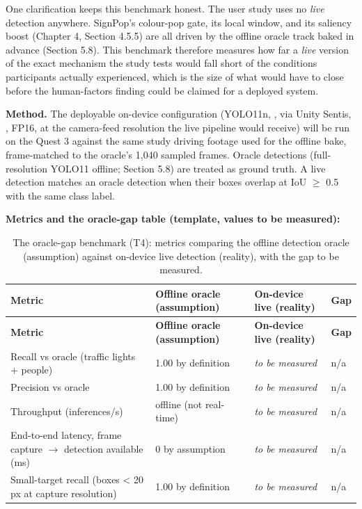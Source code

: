 One clarification keeps this benchmark honest. The user study uses no \textit{live} detection anywhere.
SignPop's colour-pop gate, its local window, and its saliency boost (Chapter 4, Section 4.5.5) are
all driven by the offline oracle track baked in advance (Section 5.8). This benchmark therefore
measures how far a \textit{live} version of the exact mechanism the study tests would fall short of the
conditions participants actually experienced, which is the size of what would have to close before
the human-factors finding could be claimed for a deployed system.

\textbf{Method.} The deployable on-device configuration (YOLO11n, \citealp{jocher2024}, via Unity Sentis, \citealp{unity2024}, FP16, at the
camera-feed resolution the live pipeline would receive) will be run on the Quest 3 against the same
study driving footage used for the offline bake, frame-matched to the oracle's 1,040 sampled
frames. Oracle detections (full-resolution YOLO11 offline; Section 5.8) are treated as ground
truth. A live detection matches an oracle detection when their boxes overlap at IoU $\geq$ 0.5 with the
same class label.

\textbf{Metrics and the oracle-gap table (template, values to be measured):}

\begin{longtable}{p{}|p{}|p{}|p{}}
\caption{The oracle-gap benchmark (T4): metrics comparing the offline detection oracle (assumption)
against on-device live detection (reality), with the gap to be measured.}\\
\hline
\textbf{Metric} & \textbf{Offline oracle (assumption)} & \textbf{On-device live (reality)} & \textbf{Gap} \\
\hline
\endfirsthead
\hline
\textbf{Metric} & \textbf{Offline oracle (assumption)} & \textbf{On-device live (reality)} & \textbf{Gap} \\
\hline
\endhead
\hline
Recall vs oracle (traffic lights + people) & 1.00 by definition & \textit{to be measured} & n/a \\
Precision vs oracle & 1.00 by definition & \textit{to be measured} & n/a \\
Throughput (inferences/s) & offline (not real-time) & \textit{to be measured} & n/a \\
End-to-end latency, frame capture $\rightarrow$ detection available (ms) & 0 by assumption & \textit{to be measured} & n/a \\
Small-target recall (boxes < 20 px at capture resolution) & 1.00 by definition & \textit{to be measured} & n/a \\
\hline
\end{longtable}

